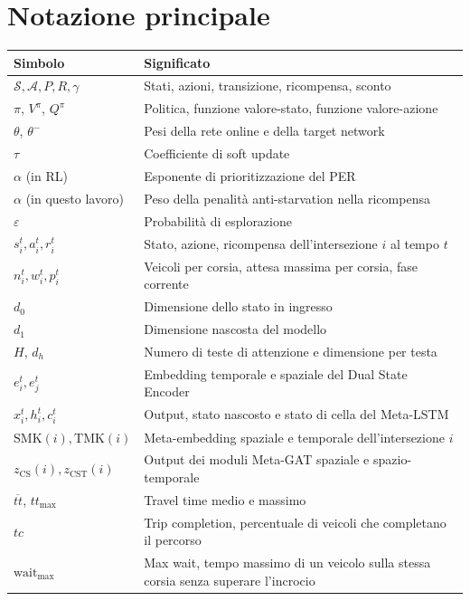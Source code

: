\section*{Notazione principale}
\begin{table}[ht]
\centering
\small
\begin{tabular}{@{}lp{10.5cm}@{}}
\toprule
Simbolo & Significato \\
\midrule
$\mathcal{S}, \mathcal{A}, P, R, \gamma$ & Stati, azioni, transizione, ricompensa, sconto \\
$\pi$, $V^\pi$, $Q^\pi$ & Politica, funzione valore-stato, funzione valore-azione \\
$\theta$, $\theta^-$ & Pesi della rete online e della target network \\
$\tau$ & Coefficiente di soft update \\
$\alpha$ (in RL) & Esponente di prioritizzazione del PER \\
$\alpha$ (in questo lavoro) & Peso della penalità anti-starvation nella ricompensa \\
$\varepsilon$ & Probabilità di esplorazione \\
$s_i^t, a_i^t, r_i^t$ & Stato, azione, ricompensa dell'intersezione $i$ al tempo $t$ \\
$n_i^t, w_i^t, p_i^t$ & Veicoli per corsia, attesa massima per corsia, fase corrente \\
$d_0$ & Dimensione dello stato in ingresso \\
$d_1$ & Dimensione nascosta del modello \\
$H$, $d_h$ & Numero di teste di attenzione e dimensione per testa \\
$e_i^t, e_j^t$ & Embedding temporale e spaziale del Dual State Encoder \\
$x_i^t, h_i^t, c_i^t$ & Output, stato nascosto e stato di cella del Meta-LSTM \\
$\mathrm{SMK}(i), \mathrm{TMK}(i)$ & Meta-embedding spaziale e temporale dell'intersezione $i$ \\
$z_{\mathrm{CS}}(i), z_{\mathrm{CST}}(i)$ & Output dei moduli Meta-GAT spaziale e spazio-temporale \\
$\overline{tt}$, $tt_{\max}$ & Travel time medio e massimo \\
$tc$ & Trip completion, percentuale di veicoli che completano il percorso \\
$\text{wait}_{\max}$ & Max wait, tempo massimo di un veicolo sulla stessa corsia senza superare l'incrocio \\
\bottomrule
\end{tabular}
\end{table}
